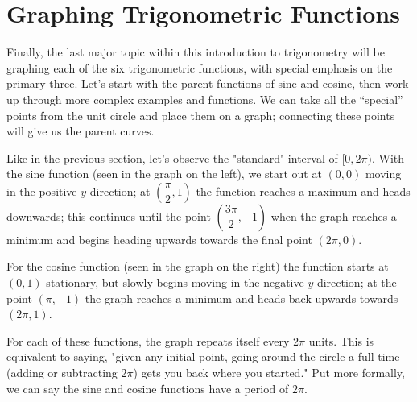 \documentclass[lang=en,11pt]{elegantbook}
\begin{document}
\section{Graphing Trigonometric Functions}
\noindent Finally, the last major topic within this introduction to trigonometry will be graphing each of the six trigonometric functions, with special emphasis on the primary three. Let’s start with the parent functions of sine and cosine, then work up through more complex examples and functions. We can take all the “special” points from the unit circle and place them on a graph; connecting these points will give us the parent curves.
\begin{figure}[!h]
    \centering
\end{figure}

Like in the previous section, let’s observe the "standard" interval of $[0,2\pi)$. With the sine function (seen in the graph on the left), we start out at $(0,0)$ moving in the positive $y$-direction; at $\left(\dfrac{\pi}{2},1\right)$ the function reaches a maximum and heads downwards; this continues until the point $\left(\dfrac{3\pi}{2},-1\right)$ when the graph reaches a minimum and begins heading upwards towards the final point $(2\pi,0)$.

For the cosine function (seen in the graph on the right) the function starts at $(0,1)$ stationary, but slowly begins moving in the negative $y$-direction; at the point $(\pi,-1)$ the graph reaches a minimum and heads back upwards towards $(2\pi,1)$.

For each of these functions, the graph repeats itself every $2\pi$ units. This is equivalent to saying, "given any initial point, going around the circle a full time (adding or subtracting $2\pi$) gets you back where you started." Put more formally, we can say the sine and cosine functions have a period of $2\pi$.
\end{document}
